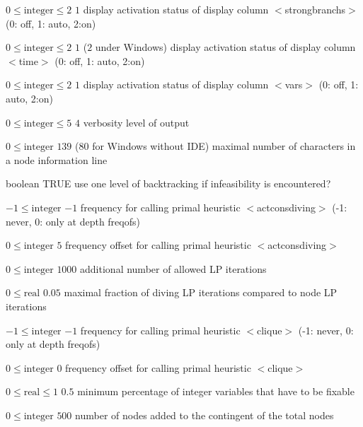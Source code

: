 %
{$0\leq\textrm{integer}\leq2$}%
{$1$}%
{display activation status of display column $<$strongbranchs$>$ (0: off, 1: auto, 2:on)}%
{}

%
{$0\leq\textrm{integer}\leq2$}%
{$1$ ($2$ under Windows)}%
{display activation status of display column $<$time$>$ (0: off, 1: auto, 2:on)}%
{}

%
{$0\leq\textrm{integer}\leq2$}%
{$1$}%
{display activation status of display column $<$vars$>$ (0: off, 1: auto, 2:on)}%
{}

%
{$0\leq\textrm{integer}\leq5$}%
{$4$}%
{verbosity level of output}%
{}

%
{$0\leq\textrm{integer}$}%
{$139$ ($80$ for Windows without IDE)}%
{maximal number of characters in a node information line}%
{}

%
{boolean}%
{TRUE}%
{use one level of backtracking if infeasibility is encountered?}%
{}

%
{$-1\leq\textrm{integer}$}%
{$-1$}%
{frequency for calling primal heuristic $<$actconsdiving$>$ (-1: never, 0: only at depth freqofs)}%
{}

%
{$0\leq\textrm{integer}$}%
{$5$}%
{frequency offset for calling primal heuristic $<$actconsdiving$>$}%
{}

%
{$0\leq\textrm{integer}$}%
{$1000$}%
{additional number of allowed LP iterations}%
{}

%
{$0\leq\textrm{real}$}%
{$0.05$}%
{maximal fraction of diving LP iterations compared to node LP iterations}%
{}

%
{$-1\leq\textrm{integer}$}%
{$-1$}%
{frequency for calling primal heuristic $<$clique$>$ (-1: never, 0: only at depth freqofs)}%
{}

%
{$0\leq\textrm{integer}$}%
{$0$}%
{frequency offset for calling primal heuristic $<$clique$>$}%
{}

%
{$0\leq\textrm{real}\leq1$}%
{$0.5$}%
{minimum percentage of integer variables that have to be fixable}%
{}

%
{$0\leq\textrm{integer}$}%
{$500$}%
{number of nodes added to the contingent of the total nodes}%
{}

